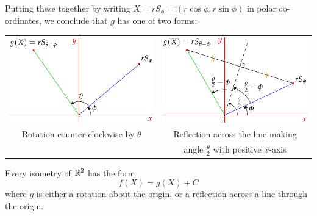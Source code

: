 Putting these together by writing $X=rS_\phi=(r\cos\phi,r\sin\phi)$ in polar co-ordinates, we conclude that $g$ has one of two forms:
\begin{center}
\begin{tabular}{c@{\qquad}c}
\includegraphics[scale=1]{isom-rot}&\includegraphics[scale=1]{isom-refl}\\
Rotation counter-clockwise by $\theta$&Reflection across the line making\\ &angle $\frac\theta 2$ with positive $x$-axis
\end{tabular}
\end{center}

\begin{thm}{}{}
Every isometry of $\mathbb{R}^2$ has the form
\[f(X)=g(X)+C\]
where $g$ is either a rotation about the origin, or a reflection across a line through the origin. 
\end{thm}

\goodbreak



